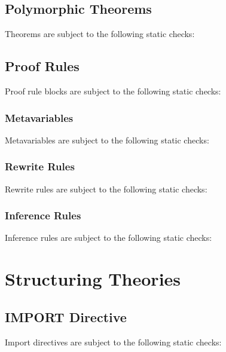 \subsection{Polymorphic Theorems}
Theorems are subject to the following static checks:

\subsection{Proof Rules}
Proof rule blocks are subject to the following static checks:

\subsubsection{Metavariables}
Metavariables are subject to the following static checks:

\subsubsection{Rewrite Rules}
Rewrite rules are subject to the following static checks:

\subsubsection{Inference Rules}
Inference rules are subject to the following static checks:

\section{Structuring Theories} \label{structuring}

\subsection{IMPORT Directive}
Import directives are subject to the following static checks: